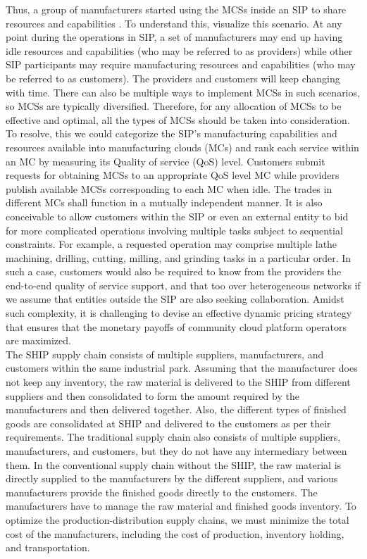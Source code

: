 \documentclass[paper=a4wide, fontsize=12pt]{scrartcl}
\begin{document}
Thus, a group of manufacturers started using the MCSs inside an SIP to share resources and capabilities \cite{Kang2022}. To understand this, visualize this scenario. At any point during the operations in SIP, a set of manufacturers may end up having idle resources and capabilities (who may be referred to as providers) while other SIP participants may require manufacturing resources and capabilities (who may be referred to as customers). The providers and customers will keep changing with time. There can also be multiple ways to implement MCSs in such scenarios, so MCSs are typically diversified. Therefore, for any allocation of MCSs to be effective and optimal, all the types of MCSs should be taken into consideration. To resolve, this we could categorize the SIP's manufacturing capabilities and resources available into manufacturing clouds (MCs) and rank each service within an MC by measuring its Quality of service (QoS) level. Customers submit requests for obtaining MCSs to an appropriate QoS level MC while providers publish available MCSs corresponding to each MC when idle. The trades in different MCs shall function in a mutually independent manner. It is also conceivable to allow customers within the SIP or even an external entity to bid for more complicated operations involving multiple tasks subject to sequential constraints. For example, a requested operation may comprise multiple lathe machining, drilling, cutting, milling, and grinding tasks in a particular order. In such a case, customers would also be required to know from the providers the end-to-end quality of service support, and that too over heterogeneous networks if we assume that entities outside the SIP are also seeking collaboration. Amidst such complexity, it is challenging to devise an effective dynamic pricing strategy that ensures that the monetary payoffs of community cloud platform operators are maximized. \\

The SHIP supply chain consists of multiple suppliers, manufacturers, and customers within the same industrial park. Assuming that the manufacturer does not keep any inventory, the raw material is delivered to the SHIP from different suppliers and then consolidated to form the amount required by the manufacturers and then delivered together. Also, the different types of finished goods are consolidated at SHIP and delivered to the customers as per their requirements. The traditional supply chain also consists of multiple suppliers, manufacturers, and customers, but they do not have any intermediary between them. In the conventional supply chain without the SHIP, the raw material is directly supplied to the manufacturers by the different suppliers, and various manufacturers provide the finished goods directly to the customers. The manufacturers have to manage the raw material and finished goods inventory. To optimize the production-distribution supply chains, we must minimize the total cost of the manufacturers, including the cost of production, inventory holding, and transportation.
\end{document}

